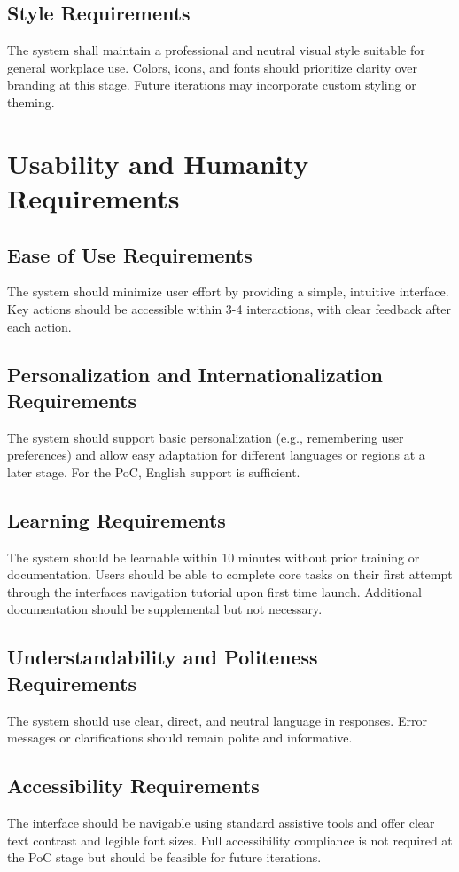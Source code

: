 \documentclass[12pt]{article}
\begin{document}
\subsection{Style Requirements}
The system shall maintain a professional and neutral visual style suitable for general workplace use. Colors, icons, and fonts should prioritize clarity over branding at this stage. Future iterations may incorporate custom styling or theming.


\section{Usability and Humanity Requirements}
\subsection{Ease of Use Requirements}
The system should minimize user effort by providing a simple, intuitive interface. Key actions should be accessible within 3-4 interactions, with clear feedback after each action.
\subsection{Personalization and Internationalization Requirements}
The system should support basic personalization (e.g., remembering user preferences) and allow easy adaptation for different languages or regions at a later stage. For the PoC, English support is sufficient.
\subsection{Learning Requirements}
The system should be learnable within 10 minutes without prior training or documentation. Users should be able to complete core tasks on their first attempt through the interfaces navigation tutorial upon first time launch. Additional documentation should be supplemental but not necessary. 
\subsection{Understandability and Politeness Requirements}
The system should use clear, direct, and neutral language in responses. Error messages or clarifications should remain polite and informative.
\subsection{Accessibility Requirements}
The interface should be navigable using standard assistive tools and offer clear text contrast and legible font sizes. Full accessibility compliance is not required at the PoC stage but should be feasible for future iterations.
\end{document}
